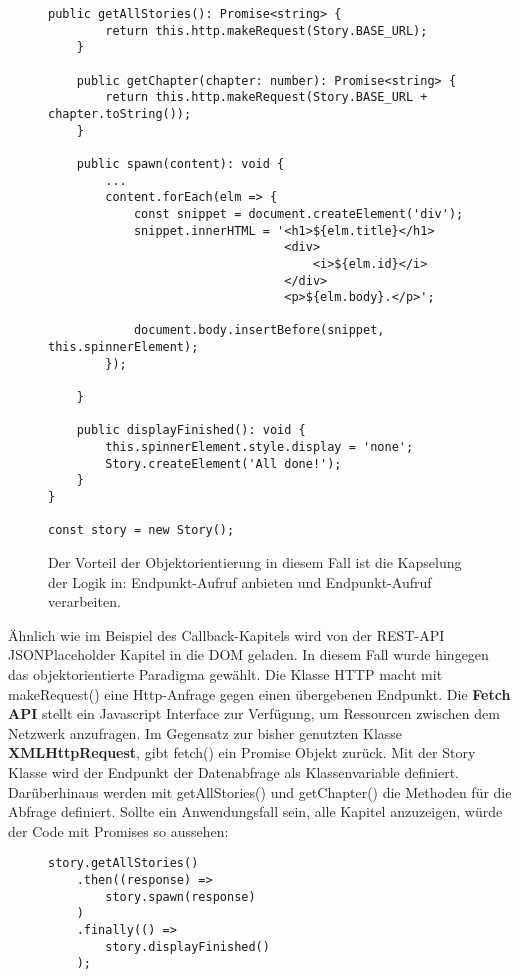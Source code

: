 \begin{figure}[H]
\begin{lstlisting}[basicstyle=\small]
    public getAllStories(): Promise<string> {
        return this.http.makeRequest(Story.BASE_URL);
    }

    public getChapter(chapter: number): Promise<string> {
        return this.http.makeRequest(Story.BASE_URL + chapter.toString());
    }
    
    public spawn(content): void {
        ...
        content.forEach(elm => {
            const snippet = document.createElement('div');
            snippet.innerHTML = '<h1>${elm.title}</h1>
                                 <div>
                                     <i>${elm.id}</i>
                                 </div>
                                 <p>${elm.body}.</p>';

            document.body.insertBefore(snippet, this.spinnerElement);
        });

    }
    
    public displayFinished(): void {
        this.spinnerElement.style.display = 'none';
        Story.createElement('All done!');
    }
}

const story = new Story();
\end{lstlisting}
\caption{Der Vorteil der Objektorientierung in diesem Fall ist die Kapselung der Logik in: Endpunkt-Aufruf anbieten und Endpunkt-Aufruf verarbeiten.}
\end{figure}

\noindent
Ähnlich wie im Beispiel des Callback-Kapitels wird von der REST-API JSONPlaceholder Kapitel in die DOM geladen. In diesem Fall wurde hingegen das objektorientierte Paradigma gewählt. Die Klasse HTTP macht mit makeRequest() eine Http-Anfrage gegen einen übergebenen Endpunkt. Die \textbf{Fetch API} stellt ein Javascript Interface zur Verfügung, um Ressourcen zwischen dem Netzwerk anzufragen. Im Gegensatz zur bisher genutzten Klasse \textbf{XMLHttpRequest}, gibt fetch() ein Promise Objekt zurück. Mit der Story Klasse wird der Endpunkt der Datenabfrage als Klassenvariable definiert. Darüberhinaus werden mit getAllStories() und getChapter() die Methoden für die Abfrage definiert. Sollte ein Anwendungsfall sein, alle Kapitel anzuzeigen, würde der Code mit Promises so aussehen:

\begin{figure}[H]
\begin{lstlisting}[basicstyle=\small]
story.getAllStories()
    .then((response) =>
        story.spawn(response)
    )
    .finally(() =>
        story.displayFinished()
    );
\end{lstlisting}
\end{figure}

